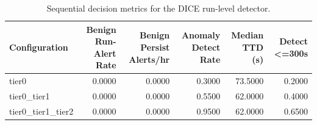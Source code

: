 \begin{table}[t]
\centering
\caption{Sequential decision metrics for the DICE run-level detector.}
\label{tab:dice_sequential_metrics}
\footnotesize
\begin{tabular}{lrrrrr}
\toprule
Configuration & Benign Run-Alert Rate & Benign Persist Alerts/hr & Anomaly Detect Rate & Median TTD (s) & Detect <=300s \\
\midrule
tier0 & 0.0000 & 0.0000 & 0.3000 & 73.5000 & 0.2000 \\
tier0_tier1 & 0.0000 & 0.0000 & 0.5500 & 62.0000 & 0.4000 \\
tier0_tier1_tier2 & 0.0000 & 0.0000 & 0.9500 & 62.0000 & 0.6500 \\
\bottomrule
\end{tabular}

\end{table}
